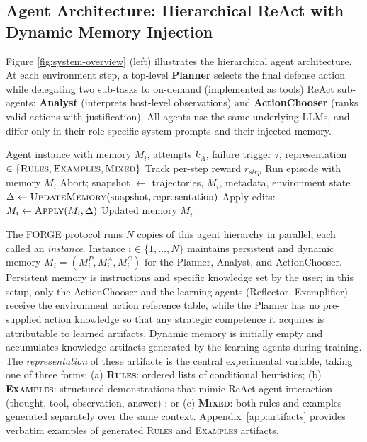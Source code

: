 \documentclass[sigconf]{acmart}
\begin{document}
\subsection{Agent Architecture: Hierarchical ReAct with Dynamic Memory Injection}
\label{sec:agent-arch}
Figure \ref{fig:system-overview} (left) illustrates the hierarchical agent architecture. At each environment step, a top-level \textbf{Planner} selects the final defense action while delegating two sub-tasks to on-demand (implemented as tools) ReAct sub-agents: \textbf{Analyst} (interprets host-level observations) and \textbf{ActionChooser} (ranks valid actions with justification). All agents use the same underlying LLMs, and differ only in their role-specific system prompts and their injected memory.
\begin{algorithm}[h!]
  \small
  \caption{Failure-Triggered Reflexion Loop}
  \label{alg:reflexion-loop}
  \begin{algorithmic}[1]
    \Require Agent instance with memory $M_i$, attempts $k_A$, failure trigger $\tau$, representation $\in\{\textsc{Rules},\textsc{Examples},\textsc{Mixed}\}$
      \State Track per-step reward $r_{step}$
      \State Run episode with memory $M_i$
        \State Abort; snapshot $\gets$ trajectories, $M_i$, metadata, environment state
        \State $\Delta \gets \textsc{UpdateMemory}(\text{snapshot}, \text{representation})$ 
        \State Apply edits: $M_i \gets \textsc{Apply}(M_i, \Delta)$
      \EndIf
    \EndFor
    \State \Return Updated memory $M_i$
  \end{algorithmic}
\end{algorithm}

The FORGE protocol runs $N$ copies of this agent hierarchy in parallel, each called an \emph{instance}. Instance $i \in \{ 1, ..., N\}$ maintains persistent and dynamic memory $M_i = (M_i^{P}, M_i^{A}, M_i^{C})$ for the Planner, Analyst, and ActionChooser. Persistent memory is instructions and specific knowledge set by the user; in this setup, only the ActionChooser and the learning agents (Reflector, Exemplifier) receive the environment action reference table, while the Planner has no pre-supplied action knowledge so that any strategic competence it acquires is attributable to learned artifacts. Dynamic memory is initially empty and accumulates knowledge artifacts generated by the learning agents during training. The \emph{representation} of these artifacts is the central experimental variable, taking one of three forms: (a) \textbf{\textsc{Rules}}: ordered lists of conditional heuristics; (b) \textbf{\textsc{Examples}}: structured demonstrations that mimic ReAct agent interaction (thought, tool, observation, answer) \citep{yao2023react}; or (c) \textbf{\textsc{Mixed}}: both rules and examples generated separately over the same context. Appendix~\ref{app:artifacts} provides verbatim examples of generated \textsc{Rules} and \textsc{Examples} artifacts.
\end{document}
